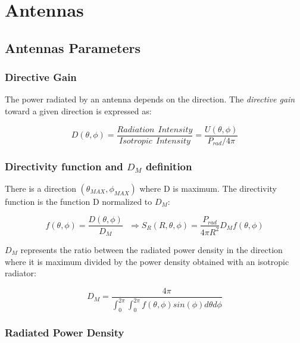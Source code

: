 \chapter{Antennas} %
\label{cha:antennas}

\section{Antennas Parameters} %
\label{sec:antennas_parameters}

\subsection{Directive Gain} %
\label{sub:directive_gain}

The power radiated by an antenna depends on the direction. The \textit{directive gain} toward a given direction is expressed as:

\begin{equation}
	D ( \theta, \phi) = \frac {Radiation \ \ Intensity} {Isotropic \ \ Intensity } = 	    \frac{ U(\theta , \phi)} {P_{rad}/ 4\pi}
\end{equation}


\subsection{Directivity function and $D_M$ definition} %
\label{sub:_d_m_}

There is a direction $(\theta_{MAX},\phi_{MAX})$ where D is maximum. The directivity function is the function D normalized to $D_M$:

\begin{equation}
	f(\theta,\phi)=\frac{ \textit{D}(\theta,\phi)}{D_M} \ \ \ \Longrightarrow S_R(R,\theta,\phi)= \frac{P_{rad}}{4\pi R^2} D_M f(\theta,\phi)
\end{equation}

$D_M$ represents the ratio between the radiated power density in the direction where it is maximum divided by the power density obtained with an isotropic radiator:

\begin{equation}
	D_M=\frac{4 \pi }{ \int_0^{2\pi}\int_0^{2\pi} f(\theta,\phi)sin(\phi) d\theta d\phi}
\end{equation}


\subsection{Radiated Power Density} %
\label{sub:radiated_power_density}


